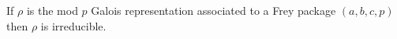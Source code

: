 \begin{theorem}[Mazur]
  \label{Mazur_Frey}
  \leanok
  If $\rho$ is the mod $p$ Galois representation associated to a Frey package $(a,b,c,p)$ then
  $\rho$ is irreducible.
\end{theorem}
